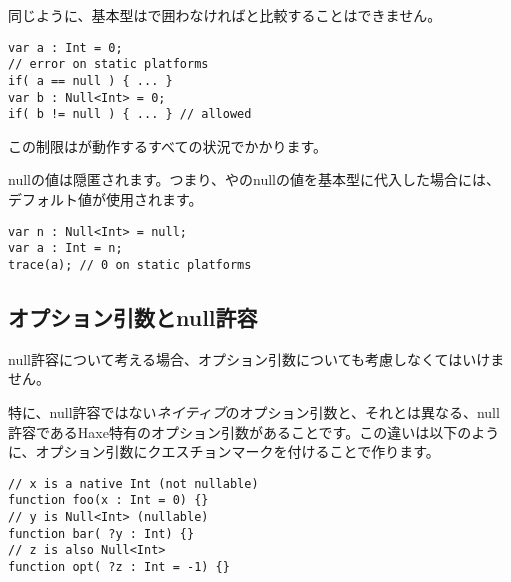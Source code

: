 同じように、基本型はで囲わなければと比較することはできません。

\begin{lstlisting}
var a : Int = 0;
// error on static platforms
if( a == null ) { ... }
var b : Null<Int> = 0;
if( b != null ) { ... } // allowed
\end{lstlisting}

この制限はが動作するすべての状況でかかります。


nullの値は隠匿されます。つまり、やのnullの値を基本型に代入した場合には、デフォルト値が使用されます。

\begin{lstlisting}
var n : Null<Int> = null;
var a : Int = n;
trace(a); // 0 on static platforms
\end{lstlisting}



\subsection{オプション引数とnull許容}
\label{types-nullability-optional-arguments}

null許容について考える場合、オプション引数についても考慮しなくてはいけません。

特に、null許容ではない\emph{ネイティブ}のオプション引数と、それとは異なる、null許容であるHaxe特有のオプション引数があることです。この違いは以下のように、オプション引数にクエスチョンマークを付けることで作ります。

\begin{lstlisting}
// x is a native Int (not nullable)
function foo(x : Int = 0) {}
// y is Null<Int> (nullable)
function bar( ?y : Int) {}
// z is also Null<Int>
function opt( ?z : Int = -1) {}
\end{lstlisting}


